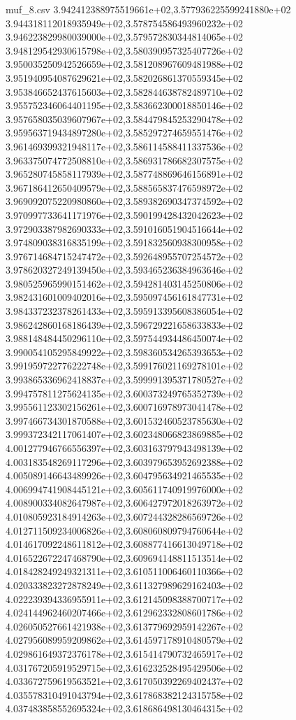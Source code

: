 \begin{filecontents*}{muf_8.csv}
3.942412388975519661e+02,3.577936225599241880e+02
3.944318112018935949e+02,3.578754586493960232e+02
3.946223829980039000e+02,3.579572830344814065e+02
3.948129542930615798e+02,3.580390957325407726e+02
3.950035250942526659e+02,3.581208967609481988e+02
3.951940954087629621e+02,3.582026861370559345e+02
3.953846652437615603e+02,3.582844638782489710e+02
3.955752346064401195e+02,3.583662300018850146e+02
3.957658035039607967e+02,3.584479845253290478e+02
3.959563719434897280e+02,3.585297274659551476e+02
3.961469399321948117e+02,3.586114588411337536e+02
3.963375074772508810e+02,3.586931786682307575e+02
3.965280745858117939e+02,3.587748869646156891e+02
3.967186412650409579e+02,3.588565837476598972e+02
3.969092075220980860e+02,3.589382690347374592e+02
3.970997733641171976e+02,3.590199428432042623e+02
3.972903387982690333e+02,3.591016051904516644e+02
3.974809038316835199e+02,3.591832560938300958e+02
3.976714684715247472e+02,3.592648955707254572e+02
3.978620327249139450e+02,3.593465236384963646e+02
3.980525965990151462e+02,3.594281403145250806e+02
3.982431601009402016e+02,3.595097456161847731e+02
3.984337232378261433e+02,3.595913395608386054e+02
3.986242860168186439e+02,3.596729221658633833e+02
3.988148484450296110e+02,3.597544934486450074e+02
3.990054105295849922e+02,3.598360534265393653e+02
3.991959722776222748e+02,3.599176021169278101e+02
3.993865336962418837e+02,3.599991395371780527e+02
3.994757811275624135e+02,3.600373249765352739e+02
3.995561123302156261e+02,3.600716978973041478e+02
3.997466734301870588e+02,3.601532460523785630e+02
3.999372342117061407e+02,3.602348066823869885e+02
4.001277946766556397e+02,3.603163797943498139e+02
4.003183548269117296e+02,3.603979653952692388e+02
4.005089146643489926e+02,3.604795634921465535e+02
4.006994741908445121e+02,3.605611740919976000e+02
4.008900334082647987e+02,3.606427972018263972e+02
4.010805923184914263e+02,3.607244328286569726e+02
4.012711509234006826e+02,3.608060809794760644e+02
4.014617092248611812e+02,3.608877416613049718e+02
4.016522672247468790e+02,3.609694148811513514e+02
4.018428249249321311e+02,3.610511006460110366e+02
4.020333823272878249e+02,3.611327989629162403e+02
4.022239394336955911e+02,3.612145098388700717e+02
4.024144962460207466e+02,3.612962332808601786e+02
4.026050527661421938e+02,3.613779692959142267e+02
4.027956089959209862e+02,3.614597178910480579e+02
4.029861649372376178e+02,3.615414790732465917e+02
4.031767205919529715e+02,3.616232528495429506e+02
4.033672759619563521e+02,3.617050392269402437e+02
4.035578310491043794e+02,3.617868382124315758e+02
4.037483858552695324e+02,3.618686498130464315e+02

\end{filecontents*}
